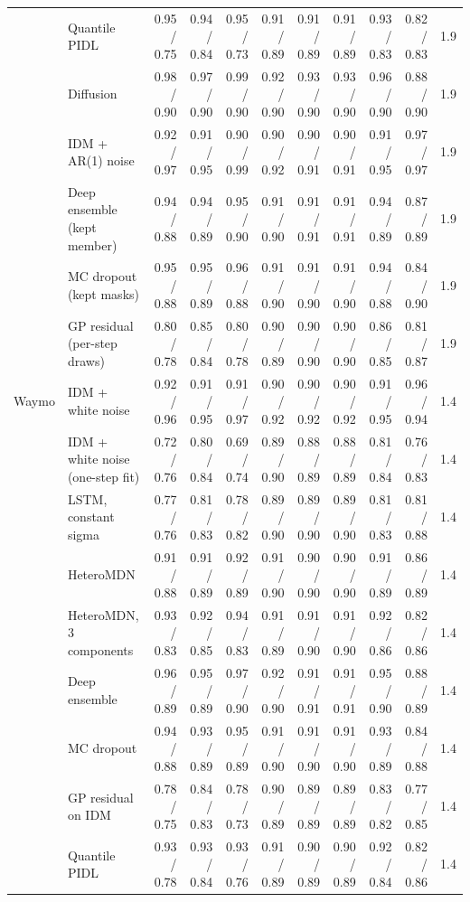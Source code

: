 \begin{longtable}{llrrrrrrrrr}
 & Quantile PIDL & 0.95 / 0.75 & 0.94 / 0.84 & 0.95 / 0.73 & 0.91 / 0.89 & 0.91 / 0.89 & 0.91 / 0.89 & 0.93 / 0.83 & 0.82 / 0.83 & 1.9 \\
 & Diffusion & 0.98 / 0.90 & 0.97 / 0.90 & 0.99 / 0.90 & 0.92 / 0.90 & 0.93 / 0.90 & 0.93 / 0.90 & 0.96 / 0.90 & 0.88 / 0.90 & 1.9 \\
 & IDM + AR(1) noise & 0.92 / 0.97 & 0.91 / 0.95 & 0.90 / 0.99 & 0.90 / 0.92 & 0.90 / 0.91 & 0.90 / 0.91 & 0.91 / 0.95 & 0.97 / 0.97 & 1.9 \\
 & Deep ensemble (kept member) & 0.94 / 0.88 & 0.94 / 0.89 & 0.95 / 0.90 & 0.91 / 0.90 & 0.91 / 0.91 & 0.91 / 0.91 & 0.94 / 0.89 & 0.87 / 0.89 & 1.9 \\
 & MC dropout (kept masks) & 0.95 / 0.88 & 0.95 / 0.89 & 0.96 / 0.88 & 0.91 / 0.90 & 0.91 / 0.90 & 0.91 / 0.90 & 0.94 / 0.88 & 0.84 / 0.90 & 1.9 \\
 & GP residual (per-step draws) & 0.80 / 0.78 & 0.85 / 0.84 & 0.80 / 0.78 & 0.90 / 0.89 & 0.90 / 0.90 & 0.90 / 0.90 & 0.86 / 0.85 & 0.81 / 0.87 & 1.9 \\
\midrule
Waymo & IDM + white noise & 0.92 / 0.96 & 0.91 / 0.95 & 0.91 / 0.97 & 0.90 / 0.92 & 0.90 / 0.92 & 0.90 / 0.92 & 0.91 / 0.95 & 0.96 / 0.94 & 1.4 \\
 & IDM + white noise (one-step fit) & 0.72 / 0.76 & 0.80 / 0.84 & 0.69 / 0.74 & 0.89 / 0.90 & 0.88 / 0.89 & 0.88 / 0.89 & 0.81 / 0.84 & 0.76 / 0.83 & 1.4 \\
 & LSTM, constant sigma & 0.77 / 0.76 & 0.81 / 0.83 & 0.78 / 0.82 & 0.89 / 0.90 & 0.89 / 0.90 & 0.89 / 0.90 & 0.81 / 0.83 & 0.81 / 0.88 & 1.4 \\
 & HeteroMDN & 0.91 / 0.88 & 0.91 / 0.89 & 0.92 / 0.89 & 0.91 / 0.90 & 0.90 / 0.90 & 0.90 / 0.90 & 0.91 / 0.89 & 0.86 / 0.89 & 1.4 \\
 & HeteroMDN, 3 components & 0.93 / 0.83 & 0.92 / 0.85 & 0.94 / 0.83 & 0.91 / 0.89 & 0.91 / 0.90 & 0.91 / 0.90 & 0.92 / 0.86 & 0.82 / 0.86 & 1.4 \\
 & Deep ensemble & 0.96 / 0.89 & 0.95 / 0.89 & 0.97 / 0.90 & 0.92 / 0.90 & 0.91 / 0.91 & 0.91 / 0.91 & 0.95 / 0.90 & 0.88 / 0.89 & 1.4 \\
 & MC dropout & 0.94 / 0.88 & 0.93 / 0.89 & 0.95 / 0.89 & 0.91 / 0.90 & 0.91 / 0.90 & 0.91 / 0.90 & 0.93 / 0.89 & 0.84 / 0.88 & 1.4 \\
 & GP residual on IDM & 0.78 / 0.75 & 0.84 / 0.83 & 0.78 / 0.73 & 0.90 / 0.89 & 0.89 / 0.89 & 0.89 / 0.89 & 0.83 / 0.82 & 0.77 / 0.85 & 1.4 \\
 & Quantile PIDL & 0.93 / 0.78 & 0.93 / 0.84 & 0.93 / 0.76 & 0.91 / 0.89 & 0.90 / 0.89 & 0.90 / 0.89 & 0.92 / 0.84 & 0.82 / 0.86 & 1.4 \\

\end{longtable}

